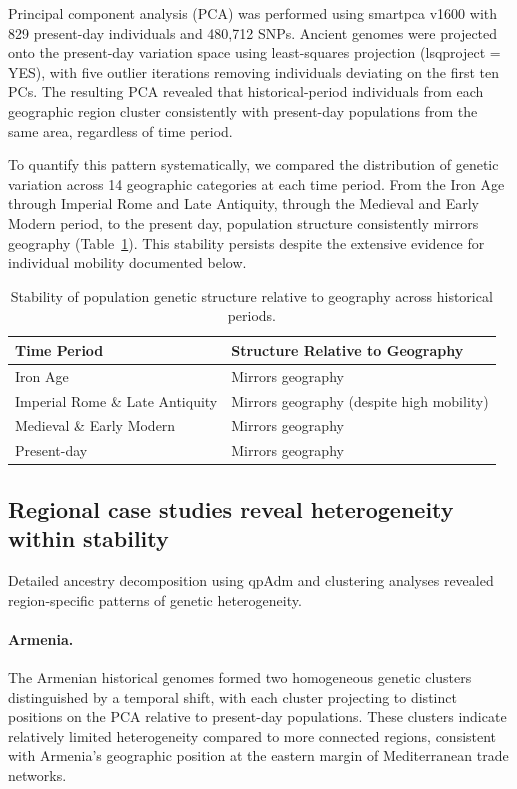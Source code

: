 \documentclass[11pt]{article}
\begin{document}
Principal component analysis (PCA) was performed using smartpca v1600 with 829 present-day individuals and 480,712 SNPs. Ancient genomes were projected onto the present-day variation space using least-squares projection (lsqproject = YES), with five outlier iterations removing individuals deviating on the first ten PCs. The resulting PCA revealed that historical-period individuals from each geographic region cluster consistently with present-day populations from the same area, regardless of time period.

To quantify this pattern systematically, we compared the distribution of genetic variation across 14 geographic categories at each time period. From the Iron Age through Imperial Rome and Late Antiquity, through the Medieval and Early Modern period, to the present day, population structure consistently mirrors geography (Table~\ref{tab:stability}). This stability persists despite the extensive evidence for individual mobility documented below.

\begin{table}[ht]
\centering
\caption{Stability of population genetic structure relative to geography across historical periods.}
\label{tab:stability}
\begin{tabular}{ll}
\toprule
Time Period & Structure Relative to Geography \\
\midrule
Iron Age & Mirrors geography \\
Imperial Rome \& Late Antiquity & Mirrors geography (despite high mobility) \\
Medieval \& Early Modern & Mirrors geography \\
Present-day & Mirrors geography \\
\bottomrule
\end{tabular}
\end{table}

\subsection{Regional case studies reveal heterogeneity within stability}

Detailed ancestry decomposition using qpAdm \citep{Haak2015,Patterson2012} and clustering analyses revealed region-specific patterns of genetic heterogeneity.

\paragraph{Armenia.} The Armenian historical genomes formed two homogeneous genetic clusters distinguished by a temporal shift, with each cluster projecting to distinct positions on the PCA relative to present-day populations. These clusters indicate relatively limited heterogeneity compared to more connected regions, consistent with Armenia's geographic position at the eastern margin of Mediterranean trade networks.
\end{document}
